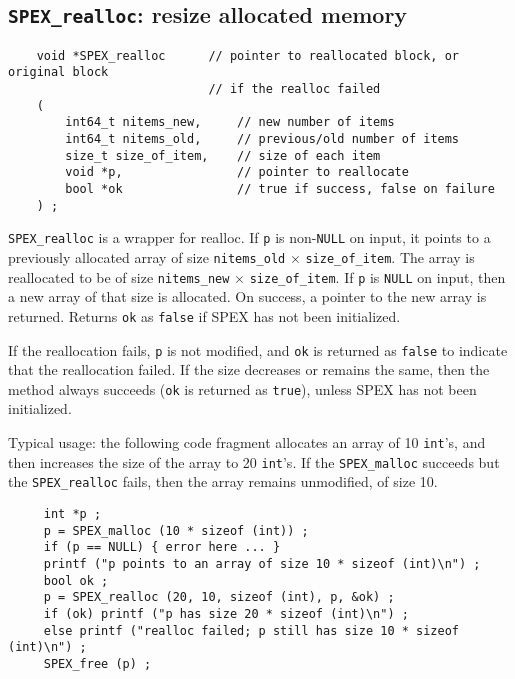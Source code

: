 \documentclass[12pt]{report}
\theoremstyle{definition}
\begin{document}
\subsection{\texttt{SPEX\_realloc}: resize allocated memory}
\label{ss:SPEX_realloc}

\begin{mdframed}[userdefinedwidth=6in]
{\footnotesize
\begin{verbatim}
    void *SPEX_realloc      // pointer to reallocated block, or original block
                            // if the realloc failed
    (
        int64_t nitems_new,     // new number of items
        int64_t nitems_old,     // previous/old number of items
        size_t size_of_item,    // size of each item
        void *p,                // pointer to reallocate
        bool *ok                // true if success, false on failure
    ) ;
\end{verbatim}
} \end{mdframed}

\verb|SPEX_realloc| is a wrapper for realloc.  If \verb|p| is non-\verb|NULL| on
input, it points to a previously allocated array of size \verb|nitems_old|
$\times$ \verb|size_of_item|.  The array is reallocated to be of size
\verb|nitems_new| $\times$ \verb|size_of_item|.  If \verb|p| is \verb|NULL| on input,
then a new array of that size is allocated.  On success, a pointer to the new
array is returned.  Returns \verb|ok| as \verb|false| if SPEX has not been
initialized.

If the reallocation fails, \verb|p| is not modified, and \verb|ok| is returned
as \verb|false| to indicate that the reallocation failed.  If the size
decreases or remains the same, then the method always succeeds (\verb|ok| is
returned as \verb|true|), unless SPEX has not been initialized.

Typical usage:  the following code fragment allocates an array of 10
\verb|int|'s, and then increases the size of the array to 20 \verb|int|'s.  If
the \verb|SPEX_malloc| succeeds but the \verb|SPEX_realloc| fails, then the
array remains unmodified, of size 10.

\begin{mdframed}[userdefinedwidth=6in]
{\footnotesize
\begin{verbatim}
     int *p ;
     p = SPEX_malloc (10 * sizeof (int)) ;
     if (p == NULL) { error here ... }
     printf ("p points to an array of size 10 * sizeof (int)\n") ;
     bool ok ;
     p = SPEX_realloc (20, 10, sizeof (int), p, &ok) ;
     if (ok) printf ("p has size 20 * sizeof (int)\n") ;
     else printf ("realloc failed; p still has size 10 * sizeof (int)\n") ;
     SPEX_free (p) ;
\end{verbatim}
} \end{mdframed}
\end{document}
